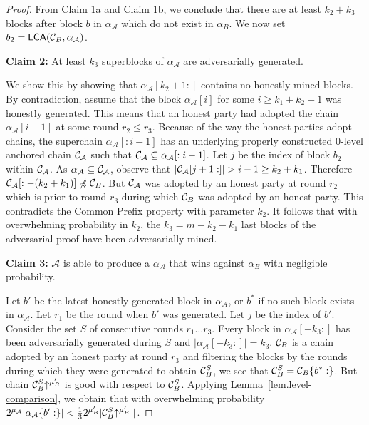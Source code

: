 \begin{proof}
    From Claim 1a and Claim 1b, we conclude that there are at least $k_2 + k_3$
    blocks after block $b$ in $\alpha_\mathcal{A}$ which do not exist in
    $\alpha_B$. We now set $b_2 = \textsf{LCA}(\mathcal{C}_B, \alpha_\mathcal{A})$.

    \textbf{Claim 2: } At least $k_3$ superblocks of $\alpha_\mathcal{A}$ are
    adversarially generated.

    We show this by showing that $\alpha_\mathcal{A}[k_2 + 1:]$ contains
    no honestly mined blocks. By contradiction, assume that the block
    $\alpha_\mathcal{A}[i]$ for some $i \geq k_1 + k_2 + 1$ was honestly generated.
    This means that an honest party had adopted the chain
    $\alpha_\mathcal{A}[i - 1]$ at some round $r_2 \leq r_3$. Because of the
    way the honest parties adopt chains, the superchain
    $\alpha_\mathcal{A}[:i - 1]$ has an underlying properly constructed
    $0$-level anchored chain $\mathcal{C}_\mathcal{A}$ such that
    $\mathcal{C}_\mathcal{A} \subseteq \alpha_\mathcal{A}[:i - 1]$. Let $j$ be
    the index of block $b_2$ within $\mathcal{C}_\mathcal{A}$.  As
    $\alpha_\mathcal{A} \subseteq \mathcal{C}_\mathcal{A}$, observe that
    $|\mathcal{C}_\mathcal{A}[j + 1:]| > i -
    1 \geq k_2 + k_1$. Therefore $\mathcal{C}_\mathcal{A}[:-(k_2 + k_1)] \not\preccurlyeq
    \mathcal{C}_B$. But $\mathcal{C}_\mathcal{A}$ was adopted by an honest party at
    round $r_2$ which is prior to round $r_3$ during which $\mathcal{C}_B$ was
    adopted by an honest party. This contradicts the Common Prefix
    \cite{backbone} property with parameter $k_2$.
    It follows that with overwhelming probability in $k_2$, the $k_3 = m - k_2 -
    k_1$ last blocks of the adversarial proof have been adversarially mined.

    \textbf{Claim 3: } $\mathcal{A}$ is able to produce a $\alpha_\mathcal{A}$
    that wins against $\alpha_B$ with negligible probability.

    Let $b'$ be the latest honestly generated block in $\alpha_\mathcal{A}$, or
    $b^*$ if no such block exists in $\alpha_\mathcal{A}$. Let $r_1$ be the
    round when $b'$ was generated. Let $j$ be the index of $b'$.
    Consider the set $S$ of consecutive rounds $r_1 \ldots r_3$. Every block
    in $\alpha_\mathcal{A}[-k_3:]$ has been adversarially generated during $S$
    and $|\alpha_\mathcal{A}[-k_3:]| = k_3$. $\mathcal{C}_B$ is a chain adopted by an
    honest party at round $r_3$ and filtering the blocks by the rounds during
    which they were generated to obtain $\mathcal{C}_B^S$, we see that $\mathcal{C}_B^S =
    \mathcal{C}_B\{b^*:\}$. But chain $\mathcal{C}_B^S\negthickspace\uparrow^{\mu_B'}$ is good with
    respect to $\mathcal{C}_B^S$. Applying Lemma~\ref{lem.level-comparison}, we
    obtain that with overwhelming probability
    $2^{\mu_\mathcal{A}}|\alpha_\mathcal{A}\{b':\}| <
    \frac{1}{3}2^{\mu_B'}|\mathcal{C}_B^S\negthickspace\uparrow^{\mu_B'}|$.


\end{proof}
